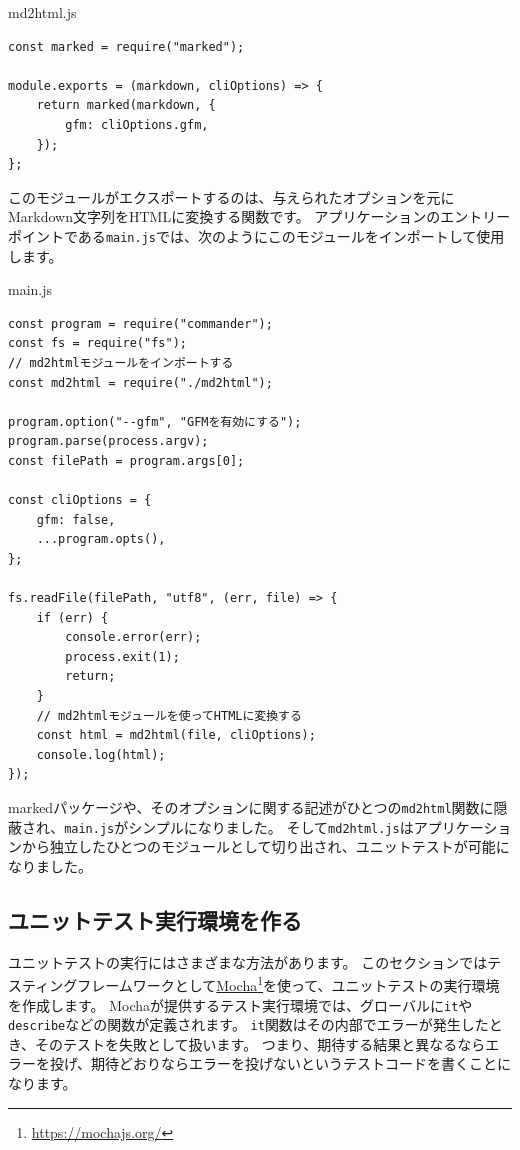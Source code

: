 \begin{listtitle}
md2html.js
\end{listtitle}
\begin{lstlisting}
const marked = require("marked");

module.exports = (markdown, cliOptions) => {
    return marked(markdown, {
        gfm: cliOptions.gfm,
    });
};
\end{lstlisting}
\listend

このモジュールがエクスポートするのは、与えられたオプションを元にMarkdown文字列をHTMLに変換する関数です。
アプリケーションのエントリーポイントである\texttt{main.js}では、次のようにこのモジュールをインポートして使用します。

\begin{listtitle}
main.js
\end{listtitle}
\begin{lstlisting}
const program = require("commander");
const fs = require("fs");
// md2htmlモジュールをインポートする
const md2html = require("./md2html");

program.option("--gfm", "GFMを有効にする");
program.parse(process.argv);
const filePath = program.args[0];

const cliOptions = {
    gfm: false,
    ...program.opts(),
};

fs.readFile(filePath, "utf8", (err, file) => {
    if (err) {
        console.error(err);
        process.exit(1);
        return;
    }
    // md2htmlモジュールを使ってHTMLに変換する
    const html = md2html(file, cliOptions);
    console.log(html);
});
\end{lstlisting}
\listend

markedパッケージや、そのオプションに関する記述がひとつの\texttt{md2html}関数に隠蔽され、\texttt{main.js}がシンプルになりました。
そして\texttt{md2html.js}はアプリケーションから独立したひとつのモジュールとして切り出され、ユニットテストが可能になりました。

\hypertarget{create-env}{%
\subsection{ユニットテスト実行環境を作る}\label{create-env}}

ユニットテストの実行にはさまざまな方法があります。
このセクションではテスティングフレームワークとして\href{https://mochajs.org/}{Mocha}\footnote{\url{https://mochajs.org/}}を使って、ユニットテストの実行環境を作成します。
Mochaが提供するテスト実行環境では、グローバルに\texttt{it}や\texttt{describe}などの関数が定義されます。
\texttt{it}関数はその内部でエラーが発生したとき、そのテストを失敗として扱います。
つまり、期待する結果と異なるならエラーを投げ、期待どおりならエラーを投げないというテストコードを書くことになります。

